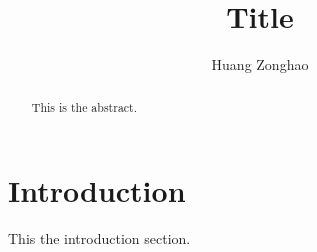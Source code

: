 \documentclass[draft, 10pt, letterpaper, conference]{IEEEtran}
\begin{document}
\title{Title}
\author{Huang Zonghao}
\maketitle

\begin{abstract}

This is the abstract.

\end{abstract}




\section{Introduction}
\label{sec:introduction}

This the introduction section.






% 

\end{document}
